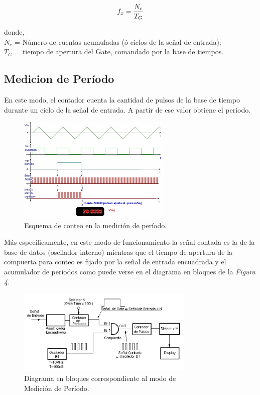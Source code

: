 \documentclass{article}
\begin{document}
\begin{equation}
	f_x = {N_c \over T_G}
\end{equation}
\medskip

\noindent donde, \\
$N_c$ = Número de cuentas acumuladas (ó ciclos de la señal de entrada);\\
$T_G$ = tiempo de apertura del Gate, comandado por la base de tiempos.
\bigskip\bigskip



\subsection {Medicion de Período}
\medskip

	En este modo, el contador cuenta la cantidad de pulsos de la base de tiempo durante un ciclo de la señal de entrada. A partir de ese valor obtiene el período. 
\bigskip\bigskip


\begin{figure}[h]
	\centering
	\includegraphics[width=0.65\textwidth]{images/03-ondasPeriodoContador.jpg}
	\medskip
	\caption{Esquema de conteo en la medición de período.}
\end{figure}
\bigskip\bigskip


	Más específicamente, en este modo de funcionamiento la señal contada es la de la base de datos (oscilador interno) mientras que el tiempo de apertura de la compuerta para conteo es fijado por la señal de entrada encuadrada y el acumulador de períodos como puede verse en el diagrama en bloques de la \textit{Figura 4}.
\bigskip\bigskip


\begin{figure}[h]
	\centering
	\includegraphics[width=0.75\textwidth]{images/04-diagrama-en-bloques-modo-medicion-periodo.jpg}
	\medskip
	\caption{Diagrama en bloques correspondiente al modo de\\ Medición de Período.}
\end{figure}
\bigskip\bigskip
\end{document}

